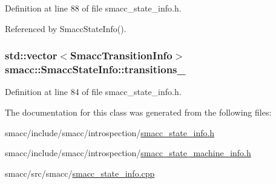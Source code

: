 Definition at line 88 of file smacc\+\_\+state\+\_\+info.\+h.



Referenced by Smacc\+State\+Info().

\subsubsection[{\texorpdfstring{transitions\+\_\+}{transitions_}}]{\setlength{\rightskip}{0pt plus 5cm}std\+::vector$<${\bf Smacc\+Transition\+Info}$>$ smacc\+::\+Smacc\+State\+Info\+::transitions\+\_\+}\hypertarget{classsmacc_1_1SmaccStateInfo_ab7945472d7b14c50c908b1d1d0c87866}{}\label{classsmacc_1_1SmaccStateInfo_ab7945472d7b14c50c908b1d1d0c87866}


Definition at line 84 of file smacc\+\_\+state\+\_\+info.\+h.



The documentation for this class was generated from the following files\+:\begin{DoxyCompactItemize}
\item 
smacc/include/smacc/introspection/\hyperlink{smacc__state__info_8h}{smacc\+\_\+state\+\_\+info.\+h}\item 
smacc/include/smacc/introspection/\hyperlink{smacc__state__machine__info_8h}{smacc\+\_\+state\+\_\+machine\+\_\+info.\+h}\item 
smacc/src/smacc/\hyperlink{smacc__state__info_8cpp}{smacc\+\_\+state\+\_\+info.\+cpp}\end{DoxyCompactItemize}
